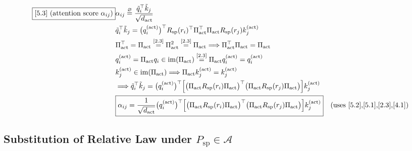 \documentclass[11pt]{article}
\newcommand{\eqdef}{\overset{\varnothing}{=}}
\newcommand{\eqref}[1]{\overset{[#1]}{=}}
\begin{document}
\begin{align}
\boxed{[5.3] \text{ (attention score }\alpha_{ij}\text{)}}
&\alpha_{ij}
\eqdef
\frac{
\tilde{q}_i^\top
\tilde{k}_j
}{
\sqrt{d_{\mathrm{act}}}
} \notag\\
&\tilde{q}_i^\top
\tilde{k}_j
=
\big(
q_i^{(\mathrm{act})}
\big)^\top
R_{\mathrm{sp}}(r_i)^\top
\Pi_{\mathrm{act}}^\top
\Pi_{\mathrm{act}}
R_{\mathrm{sp}}(r_j)
k_j^{(\mathrm{act})} \notag\\
&\Pi_{\mathrm{act}}^\top
=
\Pi_{\mathrm{act}}
\eqref{2.3}
\Pi_{\mathrm{act}}^2
\eqref{2.3}
\Pi_{\mathrm{act}}
\Longrightarrow
\Pi_{\mathrm{act}}^\top
\Pi_{\mathrm{act}}
=
\Pi_{\mathrm{act}} \notag\\
&q_i^{(\mathrm{act})}
=
\Pi_{\mathrm{act}} q_i
\in
\operatorname{im}(\Pi_{\mathrm{act}})
\eqref{2.3}
\Pi_{\mathrm{act}}
q_i^{(\mathrm{act})}
=
q_i^{(\mathrm{act})} \notag\\
&k_j^{(\mathrm{act})}
\in
\operatorname{im}(\Pi_{\mathrm{act}})
\Longrightarrow
\Pi_{\mathrm{act}}
k_j^{(\mathrm{act})}
=
k_j^{(\mathrm{act})} \notag\\
&\Longrightarrow
\tilde{q}_i^\top\tilde{k}_j
=
\big(
q_i^{(\mathrm{act})}
\big)^\top
\Big[
\big(
\Pi_{\mathrm{act}}
R_{\mathrm{sp}}(r_i)
\Pi_{\mathrm{act}}
\big)^\top
\big(
\Pi_{\mathrm{act}}
R_{\mathrm{sp}}(r_j)
\Pi_{\mathrm{act}}
\big)
\Big]
k_j^{(\mathrm{act})} \notag\\
&\boxed{
\alpha_{ij}
=
\frac{1}{\sqrt{d_{\mathrm{act}}}}

\big(
q_i^{(\mathrm{act})}
\big)^\top
\Big[
\big(
\Pi_{\mathrm{act}}
R_{\mathrm{sp}}(r_i)
\Pi_{\mathrm{act}}
\big)^\top
\big(
\Pi_{\mathrm{act}}
R_{\mathrm{sp}}(r_j)
\Pi_{\mathrm{act}}
\big)
\Big]
k_j^{(\mathrm{act})}
}
\quad(\text{uses [5.2],[5.1],[2.3],[4.1]})
\end{align}

\subsection{Substitution of Relative Law under $P_{\mathrm{sp}}\in\mathcal{A}$}
\end{document}
